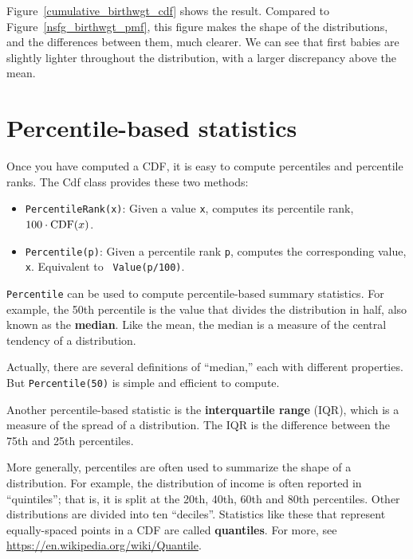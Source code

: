 \documentclass[12pt]{book}
\begin{document}
Figure~\ref{cumulative_birthwgt_cdf} shows the result.
Compared to Figure~\ref{nsfg_birthwgt_pmf},
this figure makes the shape of the distributions, and the differences
between them, much clearer.  We can see that first babies are slightly
lighter throughout the distribution, with a larger discrepancy above 
the mean.




\section{Percentile-based statistics}

Once you have computed a CDF, it is easy to compute percentiles
and percentile ranks.  The Cdf class provides these two methods:

\begin{itemize}

\item {\tt PercentileRank(x)}: Given a value {\tt x}, computes its
  percentile rank, $100 \cdot \mathrm{CDF}(x)$.

\item {\tt Percentile(p)}: Given a percentile rank {\tt p},
  computes the corresponding value, {\tt x}.  Equivalent to {\tt
    Value(p/100)}.

\end{itemize}

{\tt Percentile} can be used to compute percentile-based summary
statistics.  For example, the 50th percentile is the value that
divides the distribution in half, also known as the {\bf median}.
Like the mean, the median is a measure of the central tendency
of a distribution.

Actually, there are several definitions of ``median,'' each with
different properties.  But {\tt Percentile(50)} is simple and
efficient to compute.

Another percentile-based statistic is the {\bf interquartile range} (IQR),
which is a measure of the spread of a distribution.  The IQR
is the difference between the 75th and 25th percentiles.

More generally, percentiles are often used to summarize the shape
of a distribution.  For example, the distribution of income is
often reported in ``quintiles''; that is, it is split at the
20th, 40th, 60th and 80th percentiles.  Other distributions
are divided into ten ``deciles''.  Statistics like these that represent
equally-spaced points in a CDF are called {\bf quantiles}.
For more, see \url{https://en.wikipedia.org/wiki/Quantile}.
\end{document}
